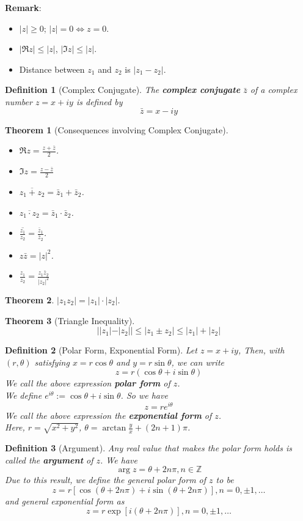 \documentclass[12pt]{article}
\newtheorem{definition}{Definition}[section]
\newtheorem{theorem}{Theorem}[section]
\theoremstyle{definition}
\begin{document}
\textbf{Remark}:
\begin{itemize}
	\item $|z|\geq 0$; $|z|=0\Leftrightarrow z=0$.
	\item $|\Re z|\leq |z|$, $|\Im z|\leq |z|$.
	\item Distance between $z_1$ and $z_2$ is $|z_1-z_2|$.
\end{itemize}
\begin{definition}[Complex Conjugate]
\normalfont The \textbf{complex conjugate} $\bar{z}$ of a complex number $z=x+iy$ is defined by
\[
\bar{z}=x-iy
\]
\end{definition}
\begin{theorem}[Consequences involving Complex Conjugate]
\normalfont 
\begin{itemize}
	\item $\Re z= \frac{z+\bar{z}}{2}$.
	\item $\Im z=\frac{z-\bar{z}}{2}$
	\item $\overline{z_1 + z_2} = \bar{z}_1 + \bar{z}_2$.
	\item $\overline{z_1\cdot z_2} = \bar{z}_1 \cdot \bar{z}_2$.
	\item $\overline{\frac{z_1}{z_2}}=\frac{\bar{z}_1}{\bar{z}_2}$.
	\item $z\bar{z}=|z|^2$.
	\item $\frac{z_1}{z_2}=\frac{z_1\bar{z}_2}{|z_2|^2}$
\end{itemize}
\end{theorem}
\begin{theorem}$|z_1z_2|=|z_1|\cdot |z_2|$.\end{theorem}
\begin{theorem}[Triangle Inequality]
\[||z_1|-|z_2||\leq |z_1\pm z_2|\leq |z_1|+|z_2|\]
\end{theorem}
\begin{definition}[Polar Form, Exponential Form]
\normalfont Let $z=x+iy$, Then, with $(r, \theta)$ satisfying $x=r\cos\theta$ and $y=r\sin\theta$, we can write
\[
z=r(\cos\theta + i\sin\theta)
\]
We call the above expression \textbf{polar form} of $z$.\\
We define $e^{i\theta}:=\cos\theta + i\sin\theta$. So we have
\[
z=re^{i\theta}
\]
We call the above expression the \textbf{exponential form} of $z$.\\
Here, $r=\sqrt{x^2 + y^2}$, $\theta = \arctan \frac{y}{x} + (2n+1)\pi$.
\end{definition}
\begin{definition}[Argument]
\normalfont Any real value that makes the polar form holds is called the \textbf{argument} of $z$. We have
\[
\arg z = \theta + 2n\pi, n\in\mathbb{Z}
\]
Due to this result, we define the general polar form of $z$ to be
\[
z=r[\cos(\theta + 2n\pi) + i\sin(\theta+ 2n\pi)], n = 0, \pm 1, \ldots
\]
and general exponential form as
\[
z=r\exp[i(\theta + 2n\pi)], n = 0, \pm 1, \ldots
\]
\end{definition}
\end{document}
